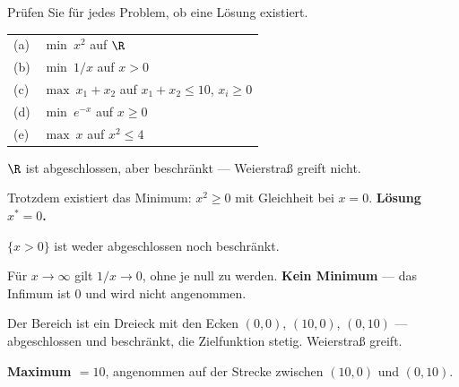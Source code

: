 \begin{aufgabe}
Prüfen Sie für jedes Problem, ob eine Lösung existiert.
\begin{center}
{\small
\renewcommand{\arraystretch}{1.4}
\begin{tabular}{@{}P{0.8cm}P{7.6cm}@{}}
\toprule
(a) & $\min\ x^2$ auf $\R$\\
(b) & $\min\ 1/x$ auf $x > 0$\\
(c) & $\max\ x_1+x_2$ auf $x_1+x_2 \le 10$, $x_i \ge 0$\\
(d) & $\min\ e^{-x}$ auf $x \ge 0$\\
(e) & $\max\ x$ auf $x^2 \le 4$\\
\bottomrule
\end{tabular}}
\end{center}

\loesung
{}
$\R$ ist abgeschlossen, aber  beschränkt --- Weierstraß greift nicht.

Trotzdem existiert das Minimum: $x^2 \ge 0$ mit Gleichheit bei $x=0$. \textbf{Lösung $x^{*}=0$.}

\begin{center}
\begin{minipage}{0.86\textwidth}
\end{minipage}
\end{center}

$\{x > 0\}$ ist weder abgeschlossen noch beschränkt.

Für $x \to \infty$ gilt $1/x \to 0$, ohne je null zu werden. \textbf{Kein Minimum} --- das Infimum ist $0$ und wird nicht angenommen.

Der Bereich ist ein Dreieck mit den Ecken $(0,0)$, $(10,0)$, $(0,10)$ --- abgeschlossen und beschränkt, die Zielfunktion stetig. Weierstraß greift.

\textbf{Maximum $= 10$}, angenommen auf der  Strecke zwischen $(10,0)$ und $(0,10)$.

\begin{center}
\begin{minipage}{0.86\textwidth}
\end{minipage}
\end{center}


\end{aufgabe}
